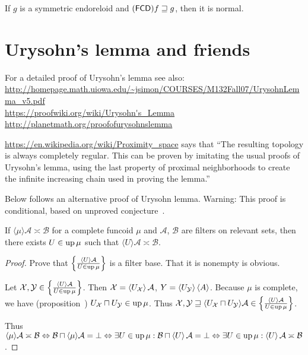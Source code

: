 \begin{cor}
If $g$ is a symmetric endoreloid and $(\mathsf{FCD}) f\sqsupseteq g$, then it is normal.
\end{cor}

\section{Urysohn's lemma and friends}

For a detailed proof of Urysohn's lemma see also:\\
\url{http://homepage.math.uiowa.edu/~jsimon/COURSES/M132Fall07/UrysohnLemma_v5.pdf}\\
\url{https://proofwiki.org/wiki/Urysohn's_Lemma}\\
\url{http://planetmath.org/proofofurysohnslemma}

\url{https://en.wikipedia.org/wiki/Proximity_space} says that
``The resulting topology is always completely regular. This can be proven by imitating the usual proofs of Urysohn's lemma, using the last property of proximal neighborhoods to create the infinite increasing chain used in proving the lemma.''

Below follows an alternative proof of Urysohn lemma. Warning: This proof is conditional,
based on unproved conjecture~.

\begin{lem}
  If $\langle \mu \rangle \mathcal{A} \asymp \mathcal{B}$ for a complete
  funcoid $\mu$ and $\mathcal{A}$, $\mathcal{B}$ are filters on relevant
  sets, then there exists $U \in \operatorname{up} \mu$ such that $\langle U
  \rangle \mathcal{A} \asymp \mathcal{B}$.
\end{lem}

\begin{proof}
  Prove that $\left\{ \frac{ \left\langle U\right\rangle \mathcal{A} }{
  U \in \operatorname{up} \mu }\right\}$ is a filter base. That it
  is nonempty is obvious.
  
  Let $\mathcal{X}, \mathcal{Y} \in \left\{ \frac{ \left\langle U\right\rangle \mathcal{A}
  }{ U \in \operatorname{up} \mu }\right\}$. Then
  $\mathcal{X} = \left\langle U_{\mathcal{X}}\right\rangle \mathcal{A}$, $Y = \left\langle 
  U_{\mathcal{Y}}\right\rangle \left\langle A\right\rangle$. Because $\mu$ is complete, we have
  (proposition~) $U_{\mathcal{X}} \sqcap U_{\mathcal{Y}} \in \operatorname{up}
  \mu$. Thus $\mathcal{X}, \mathcal{Y} \sqsupseteq \langle
  U_{\mathcal{X}} \sqcap U_{\mathcal{Y}} \rangle \mathcal{A} \in \left\{ \frac{
  \left\langle U\right\rangle \mathcal{A} }{ U \in \operatorname{up} \mu }\right\}$.
  
  Thus $\langle \mu \rangle \mathcal{A} \asymp \mathcal{B}
  \Leftrightarrow \mathcal{B} \sqcap \langle \mu \rangle \mathcal{A} =
  \bot \Leftrightarrow \exists U \in \operatorname{up} \mu: \mathcal{B} \sqcap
  \left\langle U\right\rangle \mathcal{A} = \bot \Leftrightarrow \exists U \in \operatorname{up}
  \mu: \left\langle U\right\rangle \mathcal{A} \asymp \mathcal{B}$.
\end{proof}

